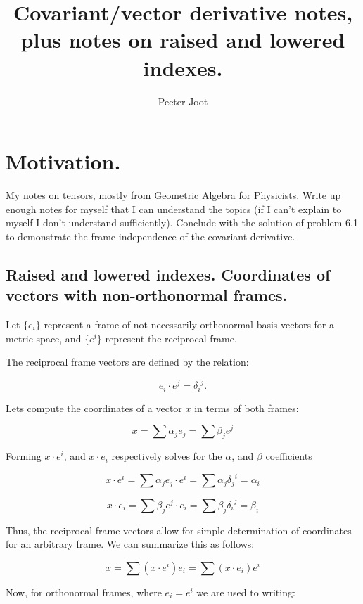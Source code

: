 \documentclass{article}      %
\title{ Covariant/vector derivative notes, plus notes on raised and lowered indexes.  }
\author{Peeter Joot}         %
\begin{document}

\maketitle{}

\section{Motivation.}

My notes on tensors, mostly from Geometric Algebra for Physicists.  Write up enough notes for myself that I can understand the topics (if I can't explain to myself I don't understand sufficiently).  Conclude with the
solution of problem 6.1 to demonstrate the frame independence of the
covariant derivative.

\subsection{ Raised and lowered indexes. Coordinates of vectors with non-orthonormal frames. }

Let $\{ e_i \}$ represent a frame of not necessarily orthonormal basis vectors for a metric space, and $\{ e^i \}$ represent the reciprocal frame.

The reciprocal frame vectors are defined by the relation:

\begin{equation}
e_i \cdot e^j = {\delta_i}^j.
\end{equation}

Lets compute the coordinates of a vector $x$ in terms of both frames:

\[
x = \sum \alpha_j e_j = \sum \beta_j e^j
\]

Forming $x \cdot e^i$, and $x \cdot e_i$ respectively solves for the $\alpha$, and $\beta$ coefficients

\[
x \cdot e^i = \sum \alpha_j e_j \cdot e^i = \sum \alpha_j {\delta_j}^i = \alpha_i
\]

\[
x \cdot e_i = \sum \beta_j e^j \cdot e_i = \sum \beta_j {\delta_i}^j = \beta_i
\]

Thus, the reciprocal frame vectors allow for simple determination of coordinates for an arbitrary frame. We can summarize this as follows:

\[
x = \sum ( x \cdot e^i ) e_i = \sum ( x \cdot e_i ) e^i
\]

Now, for orthonormal frames, where $e_i = e^i$ we are used to writing:
\end{document}
